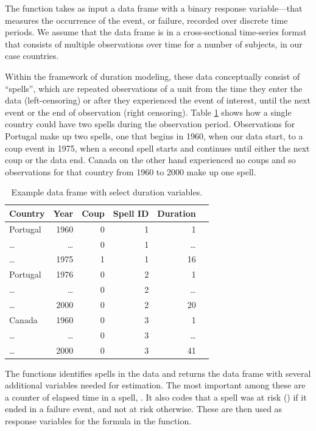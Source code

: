 The  function takes as input a data frame with a
binary response variable----that measures the occurrence of the
event, or failure, recorded over discrete time periods. We assume that
the data frame is in a cross-sectional time-series format that consists
of multiple observations over time for a number of subjects, in our case
countries.

Within the framework of duration modeling, these data conceptually
consist of ``spells'', which are repeated observations of a unit from
the time they enter the data (left-censoring) or after they experienced
the event of interest, until the next event or the end of observation
(right censoring). Table \ref{tab-ex} shows how a single country could
have two spells during the observation period. Observations for Portugal
make up two spells, one that begins in 1960, when our data start, to a
coup event in 1975, when a second spell starts and continues until
either the next coup or the data end. Canada on the other hand
experienced no coups and so observations for that country from 1960 to
2000 make up one spell.

\begin{table}
\begin{center}
\begin{tabular}{lrrrrr} \toprule
Country & Year & Coup & Spell ID & Duration \\ \midrule
Portugal & 1960 & 0 & 1 & 1  \\ 
\ldots & \ldots & 0 & 1 & \ldots \\
\ldots & 1975 & 1 & 1 & 16 \\ \midrule
Portugal & 1976 & 0 & 2 & 1 \\
\ldots & \ldots & 0 & 2 & \ldots \\
\ldots & 2000 & 0 & 2 & 20  \\ \midrule
Canada & 1960 & 0 & 3 & 1 \\
\ldots & \ldots & 0 & 3 & \ldots \\ 
\ldots & 2000 & 0 & 3 & 41 \\ \bottomrule
\end{tabular}
\end{center}
\caption{Example data frame with select duration variables.} \label{tab-ex}
\end{table}

The  functions identifies spells in the data and
returns the data frame with several additional variables needed for
estimation. The most important among these are a counter of elapsed time
in a spell, . It also codes that a spell was at risk
() if it ended in a failure event, and not at risk
otherwise. These are then used as response variables for the formula in
the  function.

